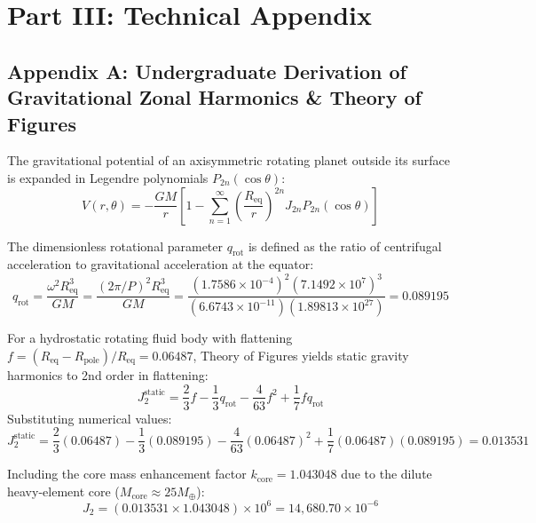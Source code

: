 \documentclass[11pt,a4paper]{article}
\begin{document}
\section*{Part III: Technical Appendix}

\subsection*{Appendix A: Undergraduate Derivation of Gravitational Zonal Harmonics \& Theory of Figures}

The gravitational potential of an axisymmetric rotating planet outside its surface is expanded in Legendre polynomials $P_{2n}(\cos \theta)$:
\begin{equation}
V(r, \theta) = -\frac{G M}{r} \left[ 1 - \sum_{n=1}^\infty \left(\frac{R_{\text{eq}}}{r}\right)^{2n} J_{2n} P_{2n}(\cos \theta) \right]
\end{equation}

The dimensionless rotational parameter $q_{\text{rot}}$ is defined as the ratio of centrifugal acceleration to gravitational acceleration at the equator:
\begin{equation}
q_{\text{rot}} = \frac{\omega^2 R_{\text{eq}}^3}{G M} = \frac{(2 \pi / P)^2 R_{\text{eq}}^3}{G M} = \frac{(1.7586 \times 10^{-4})^2 (7.1492 \times 10^7)^3}{(6.6743 \times 10^{-11}) (1.89813 \times 10^{27})} = 0.089195
\end{equation}

For a hydrostatic rotating fluid body with flattening $f = (R_{\text{eq}} - R_{\text{pole}}) / R_{\text{eq}} = 0.06487$, Theory of Figures yields static gravity harmonics to 2nd order in flattening:
\begin{equation}
J_2^{\text{static}} = \frac{2}{3} f - \frac{1}{3} q_{\text{rot}} - \frac{4}{63} f^2 + \frac{1}{7} f q_{\text{rot}}
\end{equation}
Substituting numerical values:
\begin{equation}
J_2^{\text{static}} = \frac{2}{3}(0.06487) - \frac{1}{3}(0.089195) - \frac{4}{63}(0.06487)^2 + \frac{1}{7}(0.06487)(0.089195) = 0.013531
\end{equation}

Including the core mass enhancement factor $k_{\text{core}} = 1.043048$ due to the dilute heavy-element core ($M_{\text{core}} \approx 25 M_{\oplus}$):
\begin{equation}
J_2 = (0.013531 \times 1.043048) \times 10^6 = 14,680.70 \times 10^{-6}
\end{equation}
\end{document}
